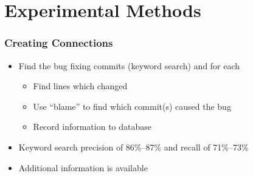 \documentclass[aspectratio=169]{beamer}
\begin{document}
\section{Experimental Methods}
\begin{frame}
  \frametitle{Creating Connections}
  
  \begin{itemize}

    \item Find the bug fixing commits (keyword search) and for each

    \begin{itemize}
      \item Find lines which changed

      \item Use ``blame'' to find which commit(s) caused the bug

      \item Record information to database
    \end{itemize}

    \item Keyword search precision of 86\%--87\% and recall of 71\%--73\%

    \item Additional information is available

  \end{itemize}
\end{frame}
\end{document}
